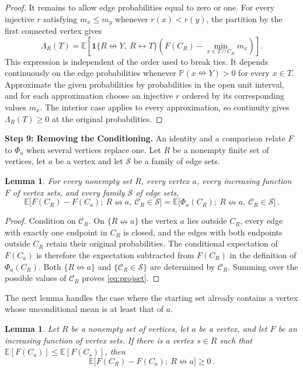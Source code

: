 \documentclass[11pt]{article}
\newtheorem{lemma}[theorem]{Lemma}
\theoremstyle{definition}
\theoremstyle{remark}
\newcommand{\PP}{\mathbb P}
\newcommand{\EE}{\mathbb E}
\newcommand{\one}{\mathbf 1}
\newcommand{\con}{\leftrightarrow}
\newcommand{\ncon}{\nleftrightarrow}
\newcommand{\eC}{\mathcal C}
\begin{document}
\begin{proof}
It remains to allow edge probabilities equal to zero or one. For every injective $r$
satisfying $m_x\leq m_y$ whenever $r(x)<r(y)$, the partition by the first connected
vertex gives
\[
 \Lambda_R(T)=\EE\!\left[
 \one\{R\ncon Y,\ R\con T\}
 \left(F(C_R)-\min_{x\in T\cap C_R}m_x\right)\right].
\]
This expression is independent of the order used to break ties. It depends continuously
on the edge probabilities whenever $\PP(x\ncon Y)>0$ for every $x\in T$. Approximate the
given probabilities by probabilities in the open unit interval, and for each approximation
choose an injective $r$ ordered by its corresponding values $m_x$. The interior case
applies to every approximation, so continuity gives $\Lambda_R(T)\geq0$ at the original
probabilities.
\end{proof}

\medskip\noindent\textbf{Step 9: Removing the Conditioning.}
An identity and a comparison relate $F$ to $\Phi_a$ when several vertices replace one. Let $R$
be a nonempty finite set of vertices, let $a$ be a vertex and let $\mathcal S$ be a family
of edge sets.

\begin{lemma}\label{lem:projset}
For every nonempty set $R$, every vertex $a$, every increasing function $F$ of vertex
sets, and every family $\mathcal S$ of edge sets,
\begin{equation}\label{eq:projset}
 \EE\bigl[F(C_R)-F(C_a);\ R\ncon a,\ \eC_R\in\mathcal S\bigr]
 =\EE\bigl[\Phi_a(C_R);\ R\ncon a,\ \eC_R\in\mathcal S\bigr]\,.
\end{equation}
\end{lemma}

\begin{proof}
Condition on $\eC_R$. On $\{R\ncon a\}$ the vertex $a$ lies outside $C_R$, every edge
with exactly one endpoint in $C_R$ is closed, and the edges with both endpoints outside
$C_R$ retain their original probabilities. The conditional expectation of $F(C_a)$ is
therefore the expectation subtracted from $F(C_R)$ in the definition of $\Phi_a(C_R)$.
Both $\{R\ncon a\}$ and $\{\eC_R\in\mathcal S\}$ are determined by $\eC_R$. Summing over
the possible values of $\eC_R$ proves \eqref{eq:projset}.
\end{proof}

The next lemma handles the case where the starting set already contains a vertex whose
unconditional mean is at least that of $a$.

\begin{lemma}\label{lem:overlap}
Let $R$ be a nonempty set of vertices, let $a$ be a vertex, and let $F$ be an increasing
function of vertex sets. If there is a vertex $s\in R$ such that
$\EE[F(C_a)]\leq\EE[F(C_s)]$, then
\begin{equation}\label{eq:overlap}
 \EE\bigl[F(C_R)-F(C_a);\ R\ncon a\bigr]\geq 0\,.
\end{equation}
\end{lemma}
\end{document}

